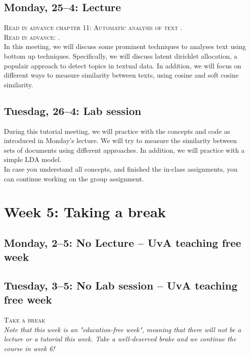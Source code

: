 \subsection*{Monday, 25--4: Lecture}
\textsc{Read in advance chapter 11: Automatic analysis of text \cite{van2021computational}.} \\
\textsc{Read in advance: \cite{Brinberg2021}.} \\

In this meeting, we will discuss some prominent techniques to analyses text using bottom up techniques. Specifically, we will discuss latent dirichlet allocation, a populair approach to detect topics in textual data. In addition, we will focus on different ways to measure similarity between texts, using cosine and soft cosine similarity. 

\subsection*{Tuesdag, 26--4: Lab session}
During this tutorial meeting, we will practice with the concepts and code as introduced in Monday's lecture. We will try to measure the similarity between sets of documents using different approaches. In addition, we will practice with a simple LDA model. \\
In case you understand all concepts, and finished the in-class assignments, you can continue working on the group assignment. 

\section*{Week 5: Taking a break}

\subsection*{Monday, 2--5: No Lecture -- UvA teaching free week}

\subsection*{Tuesday, 3--5: No Lab session -- UvA teaching free week}

\textsc{ Take a break}\\

\emph{Note that this week is an "education-free week", meaning that there will not be a lecture or a tutorial this week. Take a well-deserved brake and we continue the course in week 6!}


